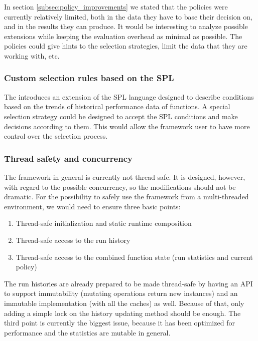 In section \ref{subsec:policy_improvements} we stated that the policies were currently relatively limited, both in the data they have to base their decision on, and in the results they can produce. It would be interesting to analyze possible extensions while keeping the evaluation overhead as minimal as possible. The policies could give hints to the selection strategies, limit the data that they are working with, etc.

\subsubsection{Custom selection rules based on the SPL}

The \cite{bulej_performance_2012} introduces an extension of the SPL language designed to describe conditions based on the trends of historical performance data of functions. A special selection strategy could be designed to accept the SPL conditions and make decisions according to them. This would allow the framework user to have more control over the selection process. 

\subsubsection{Thread safety and concurrency}

The framework in general is currently not thread safe. It is designed, however, with regard to the possible concurrency, so the modifications should not be dramatic. For the possibility to safely use the framework from a multi-threaded environment, we would need to ensure three basic points:

\begin{enumerate}
	\item Thread-safe initialization and static runtime composition
	\item Thread-safe access to the run history
	\item Thread-safe access to the combined function state (run statistics and current policy)
\end{enumerate}

The run histories are already prepared to be made thread-safe by having an API to support immutability (mutating operations return new instances) and an immutable implementation (with all the caches) as well. Because of that, only adding a simple lock on the history updating method should be enough. The third point is currently the biggest issue, because it has been optimized for performance and the statistics are mutable in general.

